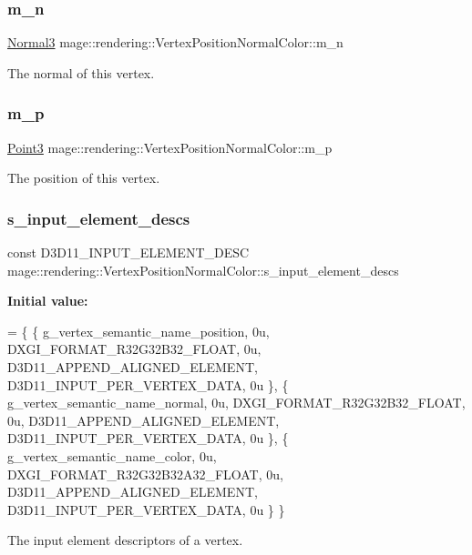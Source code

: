 \subsubsection{\texorpdfstring{m\+\_\+n}{m\_n}}
{\footnotesize\ttfamily \hyperlink{structmage_1_1_normal3}{Normal3} mage\+::rendering\+::\+Vertex\+Position\+Normal\+Color\+::m\+\_\+n}

The normal of this vertex. \hypertarget{structmage_1_1rendering_1_1_vertex_position_normal_color_ad89961e1a0b0bd97f580a34709e4e05f}{}\label{structmage_1_1rendering_1_1_vertex_position_normal_color_ad89961e1a0b0bd97f580a34709e4e05f} 
\subsubsection{\texorpdfstring{m\+\_\+p}{m\_p}}
{\footnotesize\ttfamily \hyperlink{structmage_1_1_point3}{Point3} mage\+::rendering\+::\+Vertex\+Position\+Normal\+Color\+::m\+\_\+p}

The position of this vertex. \hypertarget{structmage_1_1rendering_1_1_vertex_position_normal_color_adadf05a78d26b87baef8a9c3cb80ae54}{}\label{structmage_1_1rendering_1_1_vertex_position_normal_color_adadf05a78d26b87baef8a9c3cb80ae54} 
\subsubsection{\texorpdfstring{s\+\_\+input\+\_\+element\+\_\+descs}{s\_input\_element\_descs}}
{\footnotesize\ttfamily const D3\+D11\+\_\+\+I\+N\+P\+U\+T\+\_\+\+E\+L\+E\+M\+E\+N\+T\+\_\+\+D\+E\+SC mage\+::rendering\+::\+Vertex\+Position\+Normal\+Color\+::s\+\_\+input\+\_\+element\+\_\+descs\hspace{0.3cm}{\ttfamily [static]}}

{\bfseries Initial value\+:}
\begin{DoxyCode}
= \{
        \{ g\_vertex\_semantic\_name\_position, 0u, DXGI\_FORMAT\_R32G32B32\_FLOAT,    0u, 
      D3D11\_APPEND\_ALIGNED\_ELEMENT, D3D11\_INPUT\_PER\_VERTEX\_DATA, 0u \},
        \{ g\_vertex\_semantic\_name\_normal,   0u, DXGI\_FORMAT\_R32G32B32\_FLOAT,    0u, 
      D3D11\_APPEND\_ALIGNED\_ELEMENT, D3D11\_INPUT\_PER\_VERTEX\_DATA, 0u \},
        \{ g\_vertex\_semantic\_name\_color,    0u, DXGI\_FORMAT\_R32G32B32A32\_FLOAT, 0u, 
      D3D11\_APPEND\_ALIGNED\_ELEMENT, D3D11\_INPUT\_PER\_VERTEX\_DATA, 0u \}
    \}
\end{DoxyCode}
The input element descriptors of a vertex. 